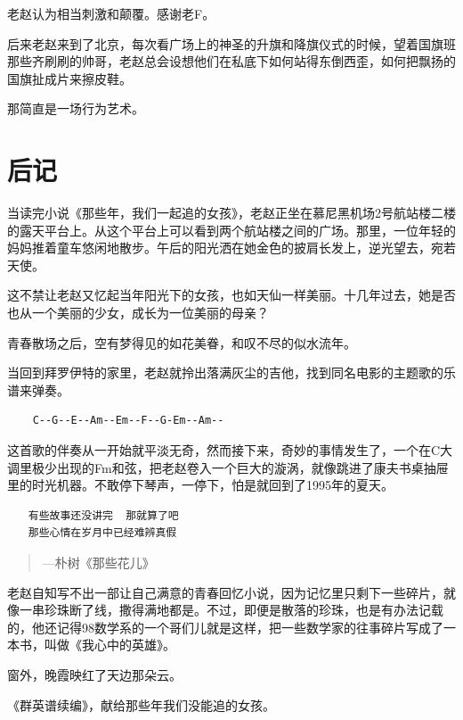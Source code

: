 \documentclass[openany]{ctexbook}
\begin{document}
老赵认为相当刺激和颠覆。感谢老F。

后来老赵来到了北京，每次看广场上的神圣的升旗和降旗仪式的时候，望着国旗班那些齐刷刷的帅哥，老赵总会设想他们在私底下如何站得东倒西歪，如何把飘扬的国旗扯成片来擦皮鞋。

那简直是一场行为艺术。

\chapter*{后记}\label{back}

当读完小说《那些年，我们一起追的女孩》，老赵正坐在慕尼黑机场2号航站楼二楼的露天平台上。从这个平台上可以看到两个航站楼之间的广场。那里，一位年轻的妈妈推着童车悠闲地散步。午后的阳光洒在她金色的披肩长发上，逆光望去，宛若天使。

这不禁让老赵又忆起当年阳光下的女孩，也如天仙一样美丽。十几年过去，她是否也从一个美丽的少女，成长为一位美丽的母亲？

青春散场之后，空有梦得见的如花美眷，和叹不尽的似水流年。

当回到拜罗伊特的家里，老赵就拎出落满灰尘的吉他，找到同名电影的主题歌的乐谱来弹奏。

\begin{verbatim}
    C--G--E--Am--Em--F--G-Em--Am--
\end{verbatim}

这首歌的伴奏从一开始就平淡无奇，然而接下来，奇妙的事情发生了，一个在C大调里极少出现的Fm和弦，把老赵卷入一个巨大的漩涡，就像跳进了康夫书桌抽屉里的时光机器。不敢停下琴声，一停下，怕是就回到了1995年的夏天。

\begin{verbatim}
　　有些故事还没讲完  那就算了吧
　　那些心情在岁月中已经难辨真假
\end{verbatim}

\begin{quote}
\begin{flushright}---朴树《那些花儿》\end{flushright}
\end{quote}

老赵自知写不出一部让自己满意的青春回忆小说，因为记忆里只剩下一些碎片，就像一串珍珠断了线，撒得满地都是。不过，即便是散落的珍珠，也是有办法记载的，他还记得98数学系的一个哥们儿就是这样，把一些数学家的往事碎片写成了一本书，叫做《我心中的英雄》。

窗外，晚霞映红了天边那朵云。

《群英谱续编》，献给那些年我们没能追的女孩。
\end{document}
